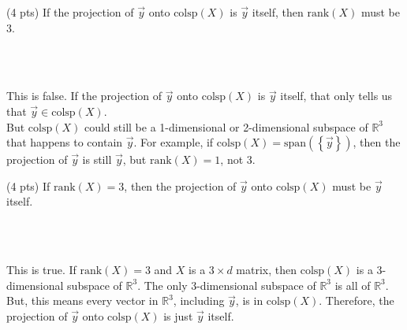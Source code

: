 \documentclass[11pt]{article}
\begin{document}
\begin{prob}[(13 pts)]
\begin{subprob}(4 pts)
If the projection of $\vec y$ onto $\text{colsp}(X)$ is $\vec y$ itself, then $\text{rank}(X)$ must be 3.

  \\ \\
\emptybox{3.25cm}
\begin{solution}
This is false. If the projection of $\vec y$ onto $\text{colsp}(X)$ is $\vec y$ itself, that only tells us that $\vec y \in \text{colsp}(X)$. \\

But $\text{colsp}(X)$ could still be a 1-dimensional or 2-dimensional subspace of $\mathbb{R}^3$ that happens to contain $\vec y$. For example, if $\text{colsp}(X) = \text{span}\left(\left\{ \vec y \right\}\right)$, then the projection of $\vec y$ is still $\vec y$, but $\text{rank}(X)=1$, not 3.
\end{solution}
\end{subprob}

\begin{subprob}(4 pts)
If $\text{rank}(X) = 3$, then the projection of $\vec y$ onto $\text{colsp}(X)$ must be $\vec y$ itself.

  \\ \\
\emptybox{3.25cm}
\begin{solution}
This is true. If $\text{rank}(X)=3$ and $X$ is a $3 \times d$ matrix, then $\text{colsp}(X)$ is a 3-dimensional subspace of $\mathbb{R}^3$. The only 3-dimensional subspace of $\mathbb{R}^3$ is all of $\mathbb{R}^3$. \\
But, this means every vector in $\mathbb{R}^3$, including $\vec y$, is in $\text{colsp}(X)$. Therefore, the projection of $\vec y$ onto $\text{colsp}(X)$ is just $\vec y$ itself.
\end{solution}
\end{subprob}

\end{prob}

\newpage
\end{document}
